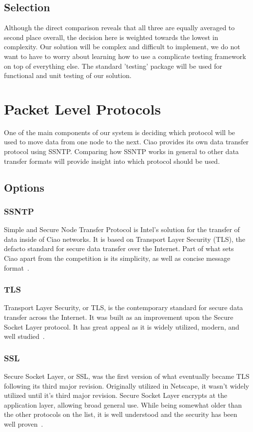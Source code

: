 \documentclass[10pt,letterpaper,onecolumn,journal]{IEEEtran}
\begin{document}
\subsection{Selection}
Although the direct comparison reveals that all three are equally averaged to
second place overall, the decision here is weighted towards the lowest in
complexity. Our solution will be complex and difficult to implement, we do not
want to have to worry about learning how to use a complicate testing framework
on top of everything else. The standard 'testing' package will be used for
functional and unit testing of our solution.

\section{Packet Level Protocols}
One of the main components of our system is deciding which protocol will be
used to move data from one node to the next. Ciao provides its own data
transfer protocol using SSNTP. Comparing how SSNTP works in general to other
data transfer formats will provide insight into which protocol should be used.

\subsection{Options}

\subsubsection{SSNTP}
Simple and Secure Node Transfer Protocol is Intel's solution for the transfer
of data inside of Ciao networks. It is based on Transport Layer Security (TLS),
the defacto standard for secure data transfer over the Internet. Part of what
sets Ciao apart from the competition is its simplicity, as well as concise
message format~\cite{ssntp}.

\subsubsection{TLS}
Transport Layer Security, or TLS, is the contemporary standard for secure data
transfer across the Internet. It was built as an improvement upon the Secure
Socket Layer protocol. It has great appeal as it is widely utilized, modern,
and well studied~\cite{tls}.

\subsubsection{SSL}
Secure Socket Layer, or SSL, was the first version of what eventually became
TLS following its third major revision. Originally utilized in Netscape, it
wasn't widely utilized until it's third major revision. Secure Socket Layer
encrypts at the application layer, allowing broad general use. While being
somewhat older than the other protocols on the list, it is well understood and
the security has been well proven~\cite{ssl}.
\end{document}
